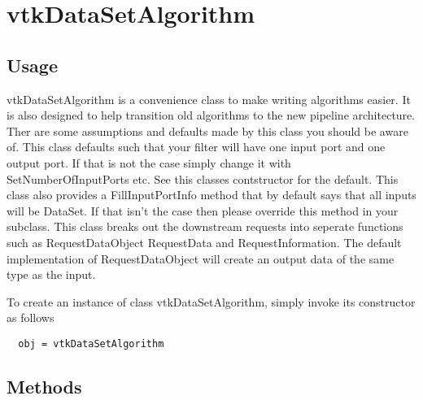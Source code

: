 \section{vtkDataSetAlgorithm}

\subsection{Usage}

 vtkDataSetAlgorithm is a convenience class to make writing algorithms
 easier. It is also designed to help transition old algorithms to the new
 pipeline architecture. Ther are some assumptions and defaults made by this
 class you should be aware of. This class defaults such that your filter
 will have one input port and one output port. If that is not the case
 simply change it with SetNumberOfInputPorts etc. See this classes
 contstructor for the default. This class also provides a FillInputPortInfo
 method that by default says that all inputs will be DataSet. If that isn't
 the case then please override this method in your subclass. This class
 breaks out the downstream requests into seperate functions such as
 RequestDataObject RequestData and RequestInformation. The default
 implementation of RequestDataObject will create an output data of the 
 same type as the input.

To create an instance of class vtkDataSetAlgorithm, simply
invoke its constructor as follows
\begin{verbatim}
  obj = vtkDataSetAlgorithm
\end{verbatim}
\subsection{Methods}

